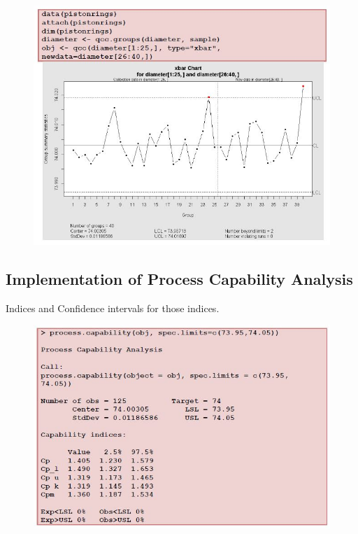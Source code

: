 \documentclass[MASTER-SPC.tex]{subfiles}
\begin{document}
			\begin{figure}[h!]
				\centering
				\includegraphics[width=1.1\linewidth]{proccapindices/pistonrings}
			\end{figure}
			
			\newpage
			\subsection{Implementation of Process Capability Analysis}
			Indices and Confidence intervals for those indices.
			
			
\begin{figure}[h!]
\centering
\includegraphics[width=1.1\linewidth]{proccapindices/qccoutput}
\end{figure}
			
\end{document}
